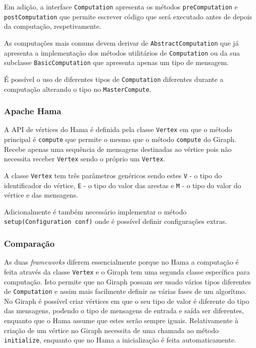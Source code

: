 Em adição, a interface \texttt{Computation} apresenta os métodos \texttt{preComputation} e \texttt{postComputation} que permite escrever código que será executado antes de depois da computação, respetivamente.

As computações mais comuns devem derivar de \texttt{AbstractComputation} que já apresenta a implementação dos métodos utilitários de \texttt{Computation} ou da sua subclasse \texttt{BasicComputation} que apresenta apenas um tipo de mensagem.

É possível o uso de diferentes tipos de \texttt{Computation} diferentes durante a computação alterando o tipo no \texttt{MasterCompute}.

\subsubsection*{Apache Hama}
A API de vértices do Hama é definida pela classe \texttt{Vertex} em que o método principal é \texttt{compute} que permite o mesmo que o método \texttt{compute} do Giraph. Recebe apenas uma sequência de mensagens destinadas ao vértice pois não necessita receber \texttt{Vertex} sendo o próprio um \texttt{Vertex}.

A classe \texttt{Vertex} tem três parâmetros genéricos sendo estes \texttt{V} - o tipo do identificador do vértice, \texttt{E} - o tipo do valor das arestas e \texttt{M} - o tipo do valor do vértice e das mensagens.


Adicionalmente é também necessário implementar o método \texttt{setup(Configuration conf)} onde é possível definir configurações extras.
\subsubsection*{Comparação}


As duas \textit{frameworks} diferem essencialmente porque no Hama a computação é feita através da classe \texttt{Vertex} e o Giraph tem uma segunda classe específica para computação. Isto permite que no Giraph possam ser usado vários tipos diferentes de \texttt{Computation} e assim mais facilmente definir as várias fases de um algorítmo.
No Giraph é possível criar vértices em que o seu tipo de valor é diferente do tipo das mensagens, podendo o tipo de mensagens de entrada e saída ser diferentes, enquanto que o Hama assume que estes serão sempre iguais. Relativamente à criação de um vértice no Giraph necessita de uma chamada ao método \texttt{initialize}, enquanto que no Hama a inicialização é feita automaticamente.